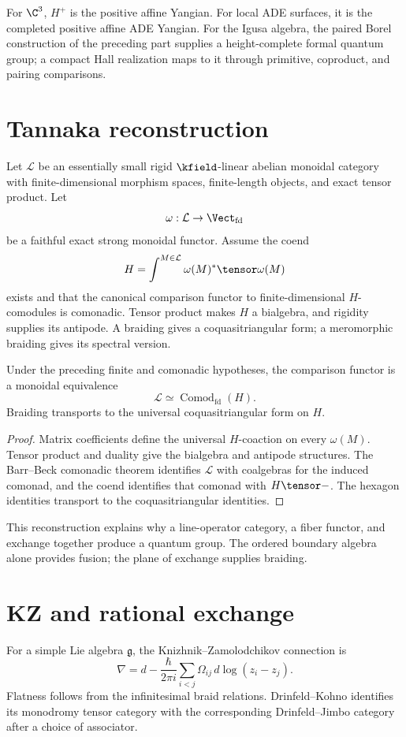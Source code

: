 For $\C^3$, $H^+$ is the positive affine Yangian. For local ADE surfaces, it is the completed positive affine ADE Yangian. For the Igusa algebra, the paired Borel construction of the preceding part supplies a height-complete formal quantum group; a compact Hall realization maps to it through primitive, coproduct, and pairing comparisons.

\chapter{Tannaka reconstruction}
Let $\mathcal L$ be an essentially small rigid $\kfield$-linear abelian monoidal category with finite-dimensional morphism spaces, finite-length objects, and exact tensor product. Let
\[
 \omega:\mathcal L\to\Vect_{\mathrm{fd}}
\]
be a faithful exact strong monoidal functor. Assume the coend
\[
 H=\int^{M\in\mathcal L}\omega(M)^*\tensor\omega(M)
\]
exists and that the canonical comparison functor to finite-dimensional $H$-comodules is comonadic. Tensor product makes $H$ a bialgebra, and rigidity supplies its antipode. A braiding gives a coquasitriangular form; a meromorphic braiding gives its spectral version.

\begin{theorem}
Under the preceding finite and comonadic hypotheses, the comparison functor is a monoidal equivalence
\[
 \mathcal L\simeq\operatorname{Comod}_{\mathrm{fd}}(H).
\]
Braiding transports to the universal coquasitriangular form on $H$.
\end{theorem}
\begin{proof}
Matrix coefficients define the universal $H$-coaction on every $\omega(M)$. Tensor product and duality give the bialgebra and antipode structures. The Barr--Beck comonadic theorem identifies $\mathcal L$ with coalgebras for the induced comonad, and the coend identifies that comonad with $H\tensor-$. The hexagon identities transport to the coquasitriangular identities.
\end{proof}

This reconstruction explains why a line-operator category, a fiber functor, and exchange together produce a quantum group. The ordered boundary algebra alone provides fusion; the plane of exchange supplies braiding.

\chapter{KZ and rational exchange}
For a simple Lie algebra $\mathfrak g$, the Knizhnik--Zamolodchikov connection is
\[
 \nabla=d-\frac{\hbar}{2\pi i}
 \sum_{i<j}\Omega_{ij}\,d\log(z_i-z_j).
\]
Flatness follows from the infinitesimal braid relations. Drinfeld--Kohno identifies its monodromy tensor category with the corresponding Drinfeld--Jimbo category after a choice of associator.

